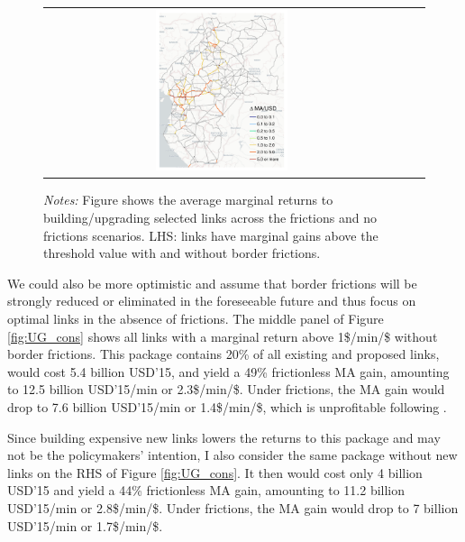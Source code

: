 \documentclass[a4paper]{article}
\begin{document}
\begin{figure}[H]
{\begin{tabular}{@{}c@{}c@{}c@{}}
\includegraphics[width=0.38\textwidth, trim= {0.9cm 0 0.9cm 0}, clip]{"../figures/PE/trans_CEMAC_network_MACR_gain_all_90kmh_pusd_cons_nofr_noadd_MAg1_google.pdf"}  
\end{tabular}
}
\scriptsize 
\emph{Notes:} Figure shows the average marginal returns to building/upgrading selected links across the frictions and no frictions scenarios. LHS: links have marginal gains above the threshold value with and without border frictions.  
\end{figure}

We could also be more optimistic and assume that border frictions will be strongly reduced or eliminated in the foreseeable future and thus focus on optimal links in the absence of frictions. The middle panel of Figure \ref{fig:UG_cons} shows all links with a marginal return above 1\$/min/\$ without border frictions. This package contains 20\% of all existing and proposed links, would cost 5.4 billion USD'15, and yield a 49\% frictionless MA gain, amounting to 12.5 billion USD'15/min or 2.3\$/min/\$. Under frictions, the MA gain would drop to 7.6 billion USD'15/min or 1.4\$/min/\$, which is unprofitable following \citet{donaldson2016railroads}. \newline


Since building expensive new links lowers the returns to this package and may not be the policymakers' intention, I also consider the same package without new links on the RHS of Figure \ref{fig:UG_cons}. It then would cost only 4 billion USD'15 and yield a 44\% frictionless MA gain, amounting to 11.2 billion USD'15/min or 2.8\$/min/\$. Under frictions, the MA gain would drop to 7 billion USD'15/min or 1.7\$/min/\$. \newline 
\end{document}
